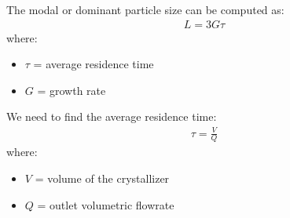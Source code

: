 \documentclass[letterpaper,10pt,english]{jupyterBook}
\begin{document}
\sphinxAtStartPar
The modal or dominant particle size can be computed as:
\begin{equation*}
\begin{split}
L=3G\tau
\end{split}
\end{equation*}
\sphinxAtStartPar
where:
\begin{itemize}
\item {} 
\sphinxAtStartPar
\(\tau\) = average residence time

\item {} 
\sphinxAtStartPar
\(G\) = growth rate

\end{itemize}

\sphinxAtStartPar
We need to find the average residence time:
\begin{equation*}
\begin{split}
\tau = \frac{V}{Q} 
\end{split}
\end{equation*}
\sphinxAtStartPar
where:
\begin{itemize}
\item {} 
\sphinxAtStartPar
\(V\)  = volume of the crystallizer

\item {} 
\sphinxAtStartPar
\(Q\)  = outlet volumetric flowrate

\end{itemize}
\end{document}
